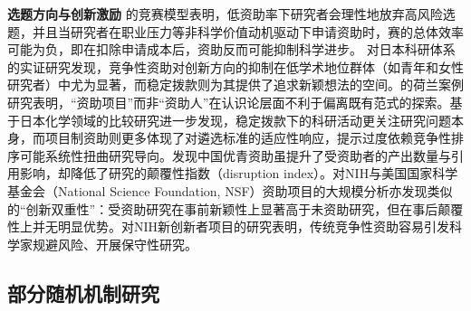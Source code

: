 \textbf{选题方向与创新激励} \quad \cite{grossContestModelsHighlight2019}的竞赛模型表明，低资助率下研究者会理性地放弃高风险选题，并且当研究者在职业压力等非科学价值动机驱动下申请资助时，赛的总体效率可能为负，即在扣除申请成本后，资助反而可能抑制科学进步。 \cite{wangFundingModelCreativity2018}对日本科研体系的实证研究发现，竞争性资助对创新方向的抑制在低学术地位群体（如青年和女性研究者）中尤为显著，而稳定拨款则为其提供了追求新颖想法的空间。\cite{franssenDrawbacksProjectFunding2018}的荷兰案例研究表明，“资助项目”而非“资助人”在认识论层面不利于偏离既有范式的探索。\cite{AWenDingBoKuanYuXiangMuZiZhuDeZiZhuChaiYiXingYanJiuJiYu20092018RiBenHuaXueLingYuZiZhuChanChuDeShuJuFenXi2021}基于日本化学领域的比较研究进一步发现，稳定拨款下的科研活动更关注研究问题本身，而项目制资助则更多体现了对遴选标准的适应性响应，提示过度依赖竞争性排序可能系统性扭曲研究导向。\cite{liMotivatingInnovationImpact2024}发现中国优青资助虽提升了受资助者的产出数量与引用影响，却降低了研究的颠覆性指数（disruption index）。\cite{yangUnveilingImpactDual2024}对NIH与美国国家科学基金会（National Science Foundation, NSF）资助项目的大规模分析亦发现类似的“创新双重性”：受资助研究在事前新颖性上显著高于未资助研究，但在事后颠覆性上并无明显优势。\cite{LiGaoFengXianGaoHuiBaoXiangMuZiZhuYouZhuYuKeYanChuangXinMaJiYuKeXueDaShuJuDeWenXianOuHeWangLuoFenXi2025}对NIH新创新者项目的研究表明，传统竞争性资助容易引发科学家规避风险、开展保守性研究。



\subsection{\textbf{部分随机机制研究}}



